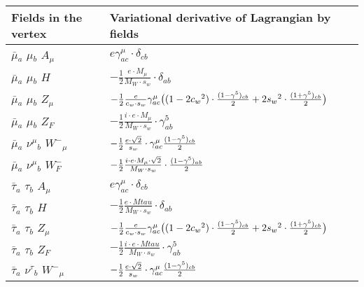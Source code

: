 \begin{center}
\begin{tabular}{|l|l|} \hline
Fields in the vertex & Variational derivative of Lagrangian by fields \\ \hline
$\bar{\mu}{}_{a }$ \phantom{-} $\mu{}_{b }$ \phantom{-} ${A}_{\mu }$ \phantom{-}  &
	$ e\gamma_{a c}^\mu \cdot \delta_{c b} $\\[2mm]
$\bar{\mu}{}_{a }$ \phantom{-} $\mu{}_{b }$ \phantom{-} ${H}_{}$ \phantom{-}  &
	$-\frac{1}{2}\frac{ e \cdot M_\mu}{ M_W \cdot s_w}\cdot \delta_{a b} $\\[2mm]
$\bar{\mu}{}_{a }$ \phantom{-} $\mu{}_{b }$ \phantom{-} ${Z}_{\mu }$ \phantom{-}  &
	$-\frac{1}{2}\frac{ e}{ c_w \cdot s_w}\gamma_{a c}^\mu \big( (1-2 c_w {}^2)\cdot {(1-\gamma^5)_{c b}\over 2} +2 s_w{}^2 \cdot {(1+\gamma^5)_{c b}\over 2} \big)$\\[2mm]
$\bar{\mu}{}_{a }$ \phantom{-} $\mu{}_{b }$ \phantom{-} $Z_F{}_{}$ \phantom{-}  &
	$-\frac{1}{2}\frac{ i \cdot e \cdot M_\mu}{ M_W \cdot s_w}\cdot \gamma_{a b}^5 $\\[2mm]
$\bar{\mu}{}_{a }$ \phantom{-} $\nu^\mu{}_{b }$ \phantom{-} $W^-{}_{\mu }$ \phantom{-}  &
	$-\frac{1}{2}\frac{ e \cdot\sqrt{2}}{ s_w}\cdot \gamma_{a c}^\mu {(1-\gamma^5)_{c b}\over 2} $\\[2mm]
$\bar{\mu}{}_{a }$ \phantom{-} $\nu^\mu{}_{b }$ \phantom{-} $W^-_F{}_{}$ \phantom{-}  &
	$-\frac{1}{2}\frac{ i \cdot e \cdot M_\mu \cdot\sqrt{2}}{ M_W \cdot s_w}\cdot {(1-\gamma^5)_{a b}\over 2} $\\[2mm]
$\bar{\tau}{}_{a }$ \phantom{-} $\tau{}_{b }$ \phantom{-} ${A}_{\mu }$ \phantom{-}  &
	$ e\gamma_{a c}^\mu \cdot \delta_{c b} $\\[2mm]
$\bar{\tau}{}_{a }$ \phantom{-} $\tau{}_{b }$ \phantom{-} ${H}_{}$ \phantom{-}  &
	$-\frac{1}{2}\frac{ e \cdot Mtau}{ M_W \cdot s_w}\cdot \delta_{a b} $\\[2mm]
$\bar{\tau}{}_{a }$ \phantom{-} $\tau{}_{b }$ \phantom{-} ${Z}_{\mu }$ \phantom{-}  &
	$-\frac{1}{2}\frac{ e}{ c_w \cdot s_w}\gamma_{a c}^\mu \big( (1-2 c_w {}^2)\cdot {(1-\gamma^5)_{c b}\over 2} +2 s_w{}^2 \cdot {(1+\gamma^5)_{c b}\over 2} \big)$\\[2mm]
$\bar{\tau}{}_{a }$ \phantom{-} $\tau{}_{b }$ \phantom{-} $Z_F{}_{}$ \phantom{-}  &
	$-\frac{1}{2}\frac{ i \cdot e \cdot Mtau}{ M_W \cdot s_w}\cdot \gamma_{a b}^5 $\\[2mm]
$\bar{\tau}{}_{a }$ \phantom{-} $\nu^\tau{}_{b }$ \phantom{-} $W^-{}_{\mu }$ \phantom{-}  &
	$-\frac{1}{2}\frac{ e \cdot\sqrt{2}}{ s_w}\cdot \gamma_{a c}^\mu {(1-\gamma^5)_{c b}\over 2} $\\[2mm]

\end{tabular}
\end{center}
